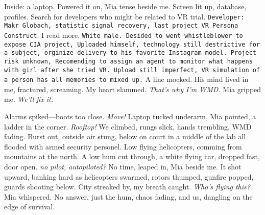 \documentclass[12pt,oneside]{book} %
\newcommand{\note}[1]{\texttt{#1}}
\begin{document}
Inside: a laptop. Powered it on, Mia tense beside me. Screen lit up, database, profiles. Search for developers who might be related to VR trial. \note{Developer: Makr Globach, statistic signal recovery, last project VR Persona Construct}. I read more. \note{White male. Desided to went whistleblower to expose CIA project, Uploaded himself, technology still destrictive for a subject, orginize delivery to his favorite Instagram model. Project risk unknown, Recomending to assign an agent to monitor what happens with girl after she tried VR. Upload still imperfect, VR simulation of a person has all memories to mixed up.} A line mocked. His mind lived in me, fractured, screaming. My heart slammed. \textit{That’s why I’m WMD.} Mia gripped me. \textit{We’ll fix it.}

Alarms spiked—boots too close. \textit{Move!} Laptop tucked underarm, Mia pointed, a ladder in the corner. \textit{Rooftop!} We climbed, rungs slick, hands trembling, WMD fading. Burst out, outside air stung,  below on court in a middle of the lab all flooded with armed security personel. Low flying helicopters, comming from mountains at the north. 
A low hum cut through, a white flying car, dropped fast, door open. \textit{no pilot, autopiloted?} No time, leaped in, Mia beside me. It shot upward, banking hard as helicopters swarmed, rotors thumped, gunfire popped, guards shooting below. City streaked by, my breath caught. \textit{Who’s flying this?} Mia whispered. No answer, just the hum, chaos fading, and us, dangling on the edge of survival.
\end{document}
